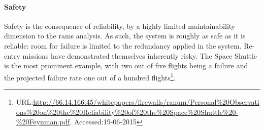 \paragraph{Safety}
Safety is the consequence of reliability, by a highly limited maintainability dimension to the \gls{rams} analysis. As such, the system is roughly as safe as it is reliable: room for failure is limited to the redundancy applied in the system. Re-entry missions have demonstrated themselves inherently risky. The Space Shuttle is the most prominent example, with two out of five flights being a failure and the projected failure rate one out of a hundred flights\footnote{URL:\url{http://66.14.166.45/whitepapers/firewalls/ranum/Personal\%20Observations\%20on\%20the\%20Reliability\%20of\%20the\%20Space\%20Shuttle\%20-\%20Feynman.pdf}. Accessed:19-06-2015}. 